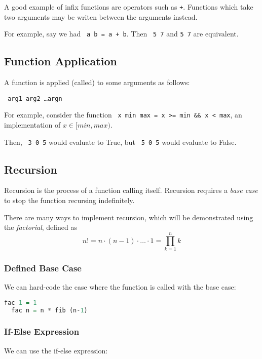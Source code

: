 A good example of infix functions are operators such as \texttt{+}. Functions which take two arguments may be writen between the arguments instead.

For example, say we had \texttt{ a b = a + b}. Then \texttt{ 5 7} and \texttt{5  7} are equivalent.

\subsection{Function Application}

A function is applied (called) to some arguments as follows:

\begin{center}
  \texttt{ arg1 arg2 \ldots argn}
\end{center}

For example, consider the function \texttt{ x min max = x >= min \&\& x < max}, an implementation of $x \in [min, max)$.

Then, \texttt{ 3 0 5} would evaluate to True, but \texttt{ 5 0 5} would evaluate to False.

\subsection{Recursion}
Recursion is the process of a function calling itself. Recursion requires a \textit{base case} to stop the function recursing indefinitely.

There are many ways to implement recursion, which will be demonstrated using the \textit{factorial}, defined as
\[n! = n \cdot (n - 1) \cdot \ldots \cdot 1 = \prod_{k = 1}^{n} k\]

\subsubsection{Defined Base Case}
We can hard-code the case where the function is called with the base case:

\begin{lstlisting}[language=haskell]
  fac 1 = 1
  fac n = n * fib (n-1) 
\end{lstlisting}

\subsubsection{If-Else Expression}
We can use the if-else expression:

